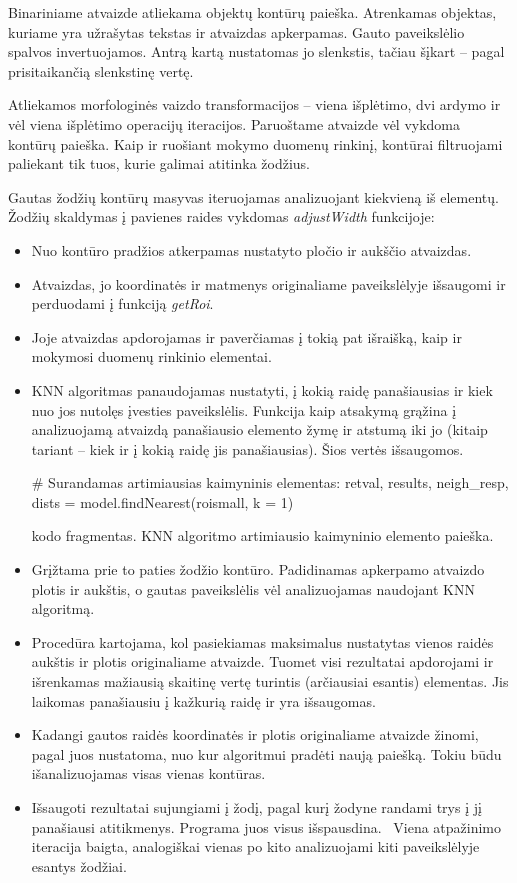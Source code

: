 \documentclass[a4paper,12pt]{article}
\begin{document}
Binariniame atvaizde atliekama objektų kontūrų paieška. Atrenkamas objektas, kuriame yra užrašytas tekstas ir atvaizdas apkerpamas. Gauto paveikslėlio spalvos invertuojamos. Antrą kartą nustatomas jo slenkstis, tačiau šįkart – pagal prisitaikančią slenkstinę vertę. 

Atliekamos morfologinės vaizdo transformacijos – viena išplėtimo, dvi ardymo ir vėl viena išplėtimo operacijų iteracijos. Paruoštame atvaizde vėl vykdoma kontūrų paieška. Kaip ir ruošiant mokymo duomenų rinkinį, kontūrai filtruojami paliekant tik tuos, kurie galimai atitinka žodžius. 

Gautas žodžių kontūrų masyvas iteruojamas analizuojant kiekvieną iš elementų. Žodžių skaldymas į pavienes raides vykdomas \textit{adjustWidth} funkcijoje:
\begin{itemize}
	\item Nuo kontūro pradžios atkerpamas nustatyto pločio ir aukščio atvaizdas.
	\item Atvaizdas, jo koordinatės ir matmenys originaliame paveikslėlyje išsaugomi ir perduodami į funkciją \textit{getRoi}.
	\item Joje atvaizdas apdorojamas ir paverčiamas į tokią pat išraišką, kaip ir mokymosi duomenų rinkinio elementai.
	\item KNN algoritmas panaudojamas nustatyti, į kokią raidę panašiausias ir kiek nuo jos nutolęs įvesties paveikslėlis. Funkcija kaip atsakymą grąžina į analizuojamą atvaizdą panašiausio elemento žymę ir atstumą iki jo (kitaip tariant – kiek ir į kokią raidę jis panašiausias). Šios vertės išsaugomos.
	 \begin{listing}[H]
	 	\begin{pythoncode}
# Surandamas artimiausias kaimyninis elementas:
retval, results, neigh_resp, dists = model.findNearest(roismall, k = 1)
	 	\end{pythoncode}
	 	\caption{kodo fragmentas. KNN algoritmo artimiausio kaimyninio elemento paieška.}	
	 \end{listing}
	 \item Grįžtama prie to paties žodžio kontūro. Padidinamas apkerpamo atvaizdo plotis ir aukštis, o gautas paveikslėlis vėl analizuojamas naudojant KNN algoritmą.
	 \item Procedūra kartojama, kol pasiekiamas maksimalus nustatytas vienos raidės aukštis ir plotis originaliame atvaizde. Tuomet visi rezultatai apdorojami ir išrenkamas mažiausią skaitinę vertę turintis (arčiausiai esantis) elementas. Jis laikomas panašiausiu į kažkurią raidę ir yra išsaugomas.
	 \item Kadangi gautos raidės koordinatės ir plotis originaliame atvaizde žinomi, pagal juos nustatoma, nuo kur algoritmui pradėti naują paiešką. Tokiu būdu išanalizuojamas visas vienas kontūras.
	 \item Išsaugoti rezultatai sujungiami į žodį, pagal kurį žodyne randami trys į jį panašiausi atitikmenys. Programa juos visus išspausdina.
	 \ Viena atpažinimo iteracija baigta, analogiškai vienas po kito analizuojami kiti paveikslėlyje esantys žodžiai.
\end{itemize} 
 
\end{document}
